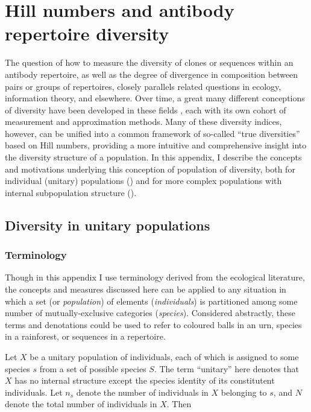 \chapter{Hill numbers and antibody repertoire diversity}
\label{app:diversity}

\normalsize

The question of how to measure the diversity of clones or sequences within an antibody repertoire, as well as the degree of divergence in composition between pairs or groups of repertoires, closely parallels related questions in ecology, information theory, and elsewhere. Over time, a great many different conceptions of diversity have been developed in these fields \citep{peet1974diversity}, each with its own cohort of measurement and approximation methods. Many of these diversity indices, however, can be unified into a common framework of so-called ``true diversities'' based on Hill numbers, providing a more intuitive and comprehensive insight into the diversity structure of a population. In this appendix, I describe the concepts and motivations underlying this conception of population of diversity, both for individual (unitary) populations () and for more complex populations with internal subpopulation structure ().

\section{Diversity in unitary populations}
\label{app:diversity-unitary}

\subsection{Terminology}
\label{app:diversity-unitary-terminology}

Though in this appendix I use terminology derived from the ecological literature, the concepts and measures discussed here can be applied to any situation in which a set (or \textit{population}) of elements (\textit{individuals}) is partitioned among some number of mutually-exclusive categories (\textit{species}). Considered abstractly, these terms and denotations could be used to refer to coloured balls in an urn, species in a rainforest, or sequences in a repertoire.

Let $X$ be a unitary population of individuals, each of which is assigned to some species $s$ from a set of possible species $S$. The term ``unitary'' here denotes that $X$ has no internal structure except the species identity of its constitutent individuals. Let $n_s$ denote the number of individuals in $X$ belonging to $s$, and $N$ denote the total number of individuals in $X$. Then 

